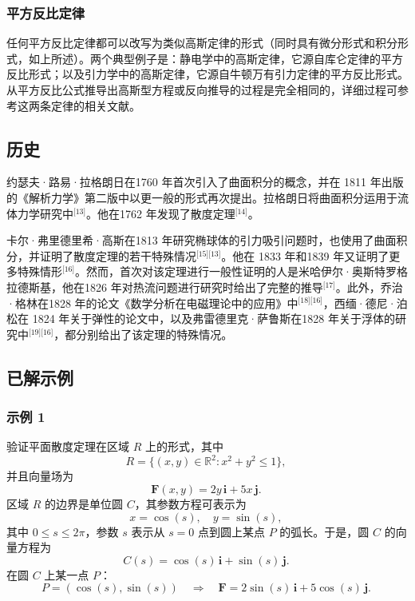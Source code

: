 \subsubsection{平方反比定律}
任何平方反比定律都可以改写为类似高斯定律的形式（同时具有微分形式和积分形式，如上所述）。两个典型例子是：静电学中的高斯定律，它源自库仑定律的平方反比形式；以及引力学中的高斯定律，它源自牛顿万有引力定律的平方反比形式。从平方反比公式推导出高斯型方程或反向推导的过程是完全相同的，详细过程可参考这两条定律的相关文献。
\subsection{历史}
约瑟夫·路易·拉格朗日在1760 年首次引入了曲面积分的概念，并在 1811 年出版的《解析力学》第二版中以更一般的形式再次提出。拉格朗日将曲面积分运用于流体力学研究中\(^\text{[13]}\)。他在1762 年发现了散度定理\(^\text{[14]}\)。

卡尔·弗里德里希·高斯在1813 年研究椭球体的引力吸引问题时，也使用了曲面积分，并证明了散度定理的若干特殊情况\(^\text{[15][13]}\)。他在 1833 年和1839 年又证明了更多特殊情形\(^\text{[16]}\)。然而，首次对该定理进行一般性证明的人是米哈伊尔·奥斯特罗格拉德斯基，他在1826 年对热流问题进行研究时给出了完整的推导\(^\text{[17]}\)。此外，乔治·格林在1828 年的论文《数学分析在电磁理论中的应用》中\(^\text{[18][16]}\)，西缅·德尼·泊松在 1824 年关于弹性的论文中，以及弗雷德里克·萨鲁斯在1828 年关于浮体的研究中\(^\text{[19][16]}\)，都分别给出了该定理的特殊情况。
\subsection{已解示例}
\subsubsection{示例 1}
验证平面散度定理在区域 $R$ 上的形式，其中
$$
R = \{(x, y) \in \mathbb{R}^2 : x^2 + y^2 \le 1\},~
$$
并且向量场为
$$
\mathbf{F}(x, y) = 2y\,\mathbf{i} + 5x\,\mathbf{j}.~
$$
区域 $R$ 的边界是单位圆 $C$，其参数方程可表示为
$$
x = \cos(s), \quad y = \sin(s),~
$$
其中 $0 \le s \le 2\pi$，参数 $s$ 表示从 $s=0$ 点到圆上某点 $P$ 的弧长。于是，圆 $C$ 的向量方程为
$$
C(s) = \cos(s)\,\mathbf{i} + \sin(s)\,\mathbf{j}.~
$$
在圆 $C$ 上某一点 $P$：
$$
P = (\cos(s), \sin(s)) \quad \Rightarrow \quad 
\mathbf{F} = 2\sin(s)\,\mathbf{i} + 5\cos(s)\,\mathbf{j}.~
$$
